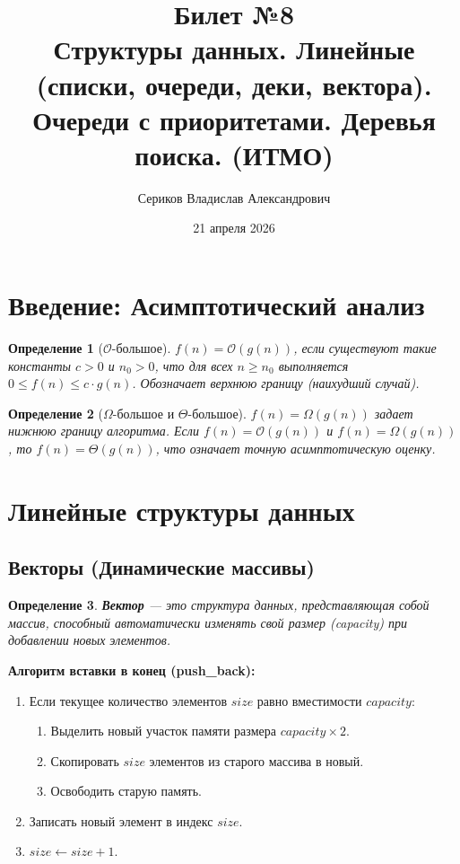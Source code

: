 \documentclass[12pt,a4paper]{article}
\title{Билет №8 \\ \small Структуры данных. Линейные (списки, очереди, деки, вектора). Очереди с приоритетами. Деревья поиска. (ИТМО)}
\author{Сериков Владислав Александрович}
\date{21 апреля 2026}
\newtheorem{definition}{Определение}
\begin{document}
\maketitle
\tableofcontents
\newpage

\section{Введение: Асимптотический анализ}

\begin{definition}[$\mathcal{O}$-большое]
$f(n) = \mathcal{O}(g(n))$, если существуют такие константы $c > 0$ и $n_0 > 0$, что для всех $n \ge n_0$ выполняется $0 \le f(n) \le c \cdot g(n)$. Обозначает верхнюю границу (наихудший случай).
\end{definition}

\begin{definition}[$\Omega$-большое и $\Theta$-большое]
$f(n) = \Omega(g(n))$ задает нижнюю границу алгоритма. Если $f(n) = \mathcal{O}(g(n))$ и $f(n) = \Omega(g(n))$, то $f(n) = \Theta(g(n))$, что означает точную асимптотическую оценку.
\end{definition}

\section{Линейные структуры данных}

\subsection{Векторы (Динамические массивы)}
\begin{definition}
\textbf{Вектор} — это структура данных, представляющая собой массив, способный автоматически изменять свой размер (capacity) при добавлении новых элементов.
\end{definition}

\textbf{Алгоритм вставки в конец (push\_back):}
\begin{enumerate}
    \item Если текущее количество элементов $size$ равно вместимости $capacity$:
    \begin{enumerate}
        \item Выделить новый участок памяти размера $capacity \times 2$.
        \item Скопировать $size$ элементов из старого массива в новый.
        \item Освободить старую память.
    \end{enumerate}
    \item Записать новый элемент в индекс $size$.
    \item $size \leftarrow size + 1$.
\end{enumerate}
\end{document}
